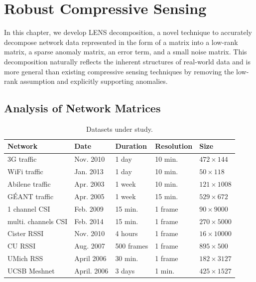 \chapter{Robust Compressive Sensing}
\label{chp:robust-cs}

In this chapter, we develop LENS decomposition, a novel technique to accurately decompose network data represented in the form of a matrix into a low-rank matrix, a sparse anomaly matrix, an error term, and a small noise matrix. This decomposition naturally reflects the inherent structures of real-world data and is more general than existing compressive sensing techniques by removing the low-rank assumption and explicitly supporting anomalies.


\section{Analysis of Network Matrices}
\label{sec:measurement}

\begin{table}[htb]
  \centering
  {\small
    \vspace{-0.1in}
  \begin{tabular}{|@{~}l@{~~}|@{~~}l@{~}|@{~~}l@{~}|@{~~}l@{~}|@{~~}l@{~}|}
\hline
Network & Date & Duration & Resolution & Size  \\\hline
3G traffic & Nov. 2010 & 1 day & 10 min. & $472 \times 144$ \\\hline
WiFi traffic & Jan. 2013 & 1 day & 10 min. & $50 \times 118$ \\\hline
Abilene traffic~\cite{abilene} & Apr. 2003 & 1 week & 10 min. & $121 \times 1008$ \\\hline
G\'{E}ANT traffic~\cite{uhlig06:_provid} &  Apr. 2005 & 1 week  & 15 min. & $529 \times 672$ \\\hline
1 channel CSI & Feb. 2009 & 15 min. & 1 frame & $90 \times 9000$ \\\hline
multi. channels CSI & Feb. 2014 & 15 min. & 1 frame & $270 \times 5000$\\\hline  %
Cister RSSI~\cite{RSSI1} & Nov. 2010 & 4 hours & 1 frame & $16 \times 10000$ \\\hline
CU RSSI~\cite{RSSI2} & Aug. 2007 & 500 frames & 1 frame & $895 \times 500$ \\\hline
UMich RSS~\cite{UMich-RSS} & April 2006 & 30 min. & 1 frame & $182 \times 3127$
\\\hline     %
UCSB Meshnet~\cite{UCSB-Meshnet} & April. 2006 & 3 days & 1 min. & $425 \times 1527$ \\\hline  %
  \end{tabular}
  }
  \caption{Datasets under study.}
  \label{tab:data}
\end{table}

